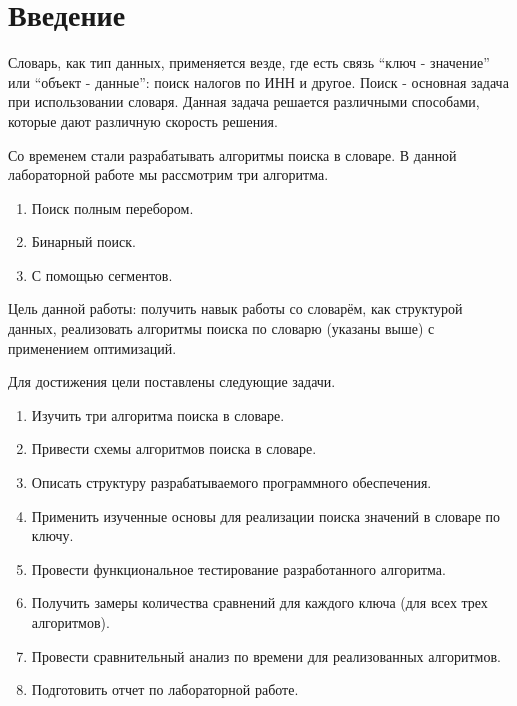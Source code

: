 \chapter*{Введение}

Словарь, как тип данных, применяется везде, где есть связь “ключ - значение” или “объект - данные”: поиск налогов по ИНН и другое. Поиск - основная задача при использовании словаря. Данная задача решается различными способами, которые дают различную скорость решения.

Со временем стали разрабатывать алгоритмы поиска в словаре. В данной лабораторной работе мы рассмотрим три алгоритма.
\begin{enumerate}
	\item Поиск полным перебором.
	\item Бинарный поиск.
	\item С помощью сегментов.
\end{enumerate}

Цель данной работы: получить навык работы со словарём, как структурой данных, реализовать алгоритмы поиска по словарю (указаны выше) с применением оптимизаций.

Для достижения цели поставлены следующие задачи.
\begin{enumerate}
	\item Изучить три алгоритма поиска в словаре.
	\item Привести схемы алгоритмов поиска в словаре.
	\item Описать структуру разрабатываемого программного обеспечения.
	\item Применить изученные основы для реализации поиска значений в словаре по ключу.
	\item Провести функциональное тестирование разработанного алгоритма.
	\item Получить замеры количества сравнений для каждого ключа (для всех трех алгоритмов).
	\item Провести сравнительный анализ по времени для реализованных алгоритмов.
	\item Подготовить отчет по лабораторной работе.
\end{enumerate}